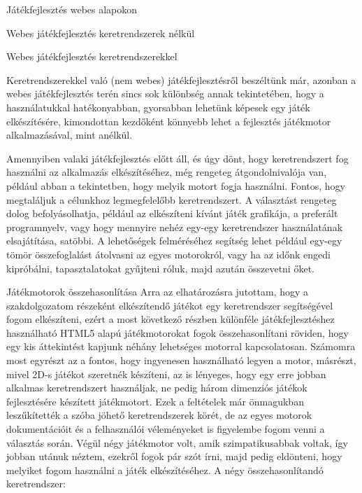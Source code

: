 \begin{MyChapter}{Játékfejlesztés webes alapokon}
\begin{MySection}{Webes játékfejlesztés keretrendszerek nélkül}
	\end{MySection}

	\begin{MySection}{Webes játékfejlesztés keretrendszerekkel}
		
		Keretrendszerekkel való (nem webes) játékfejlesztésről beszéltünk már, azonban a webes játékfejlesztés terén sincs sok különbség annak tekintetében, hogy a használatukkal hatékonyabban, gyorsabban lehetünk képesek egy játék elkészítésére, kimondottan kezdőként könnyebb lehet a fejlesztés játékmotor alkalmazásával, mint anélkül.
		
		Amennyiben valaki játékfejlesztés előtt áll, és úgy dönt, hogy keretrendszert fog használni az alkalmazás elkészítéséhez, még rengeteg átgondolnivalója van, például abban a tekintetben, hogy melyik motort fogja használni. Fontos, hogy megtaláljuk a célunkhoz legmegfelelőbb keretrendszert. A választást rengeteg dolog befolyásolhatja, például az elkészíteni kívánt játék grafikája, a preferált programnyelv, vagy hogy mennyire nehéz egy-egy keretrendszer használatának elsajátítása, satöbbi. A lehetőségek felméréséhez segítség lehet például egy-egy tömör összefoglalást átolvasni az egyes motorokról, vagy ha az időnk engedi kipróbálni, tapasztalatokat gyűjteni róluk, majd azután összevetni őket.
		
		\begin{MySubSection}{Játékmotorok összehasonlítása}
			Arra az elhatározásra jutottam, hogy a szakdolgozatom részeként elkészítendő játékot egy keretrendszer segítségével fogom elkészíteni, ezért a most következő részben különféle játékfejlesztéshez használható HTML5 alapú játékmotorokat fogok összehasonlítani röviden, hogy egy kis áttekintést kapjunk néhány lehetséges motorral kapcsolatosan. Számomra most egyrészt az a fontos, hogy ingyenesen használható legyen a motor, másrészt, mivel 2D-s játékot szeretnék készíteni, az is lényeges, hogy egy erre jobban alkalmas keretrendszert használjak, ne pedig három dimenziós játékok fejlesztésére készített játékmotort. 
			Ezek a feltételek már önmagukban leszűkítették a szóba jöhető keretrendszerek körét, de az egyes motorok dokumentációit és a felhasználói véleményeket is figyelembe fogom venni a választás során. Végül négy játékmotor volt, amik szimpatikusabbak voltak, így jobban utánuk néztem, ezekről fogok pár szót írni, majd pedig eldönteni, hogy melyiket fogom használni a játék elkészítéséhez.
			\newline \newline
			A négy összehasonlítandó keretrendszer:
			

\end{MySubSection}
\end{MySection}
\end{MyChapter}
